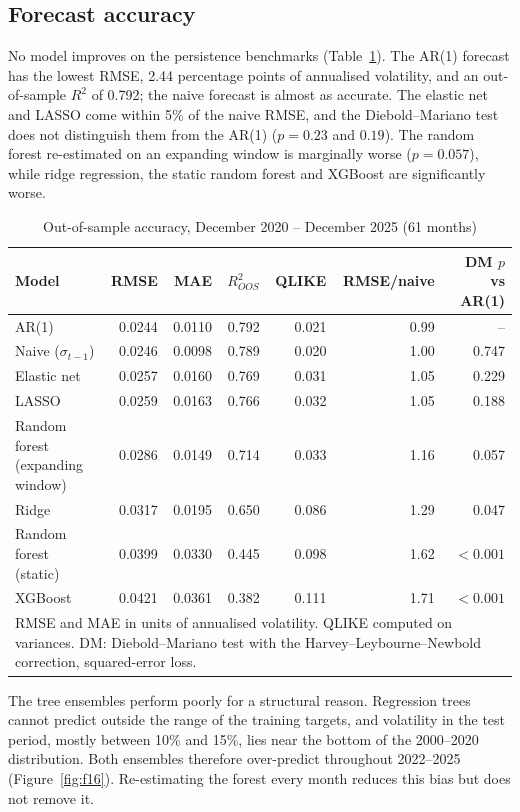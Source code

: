 \documentclass[10pt,twocolumn,a4paper]{article}
\begin{document}
\subsection{Forecast accuracy}

No model improves on the persistence benchmarks (Table~\ref{tab:ml}). The AR(1) forecast has the lowest RMSE, 2.44 percentage points of annualised volatility, and an out-of-sample $R^2$ of 0.792; the naive forecast is almost as accurate. The elastic net and LASSO come within 5\% of the naive RMSE, and the Diebold--Mariano test does not distinguish them from the AR(1) ($p=0.23$ and $0.19$). The random forest re-estimated on an expanding window is marginally worse ($p=0.057$), while ridge regression, the static random forest and XGBoost are significantly worse.

\begin{table}[!t]\centering\small
\caption{Out-of-sample accuracy, December 2020 -- December 2025 (61 months)}\label{tab:ml}
\setlength{\tabcolsep}{4pt}
\begin{tabular}{lrrrrrr}
\toprule
Model & RMSE & MAE & $R^2_{OOS}$ & QLIKE & RMSE/naive & DM $p$ vs AR(1) \\
\midrule
AR(1) & 0.0244 & 0.0110 & 0.792 & 0.021 & 0.99 & -- \\
Naive ($\sigma_{t-1}$) & 0.0246 & 0.0098 & 0.789 & 0.020 & 1.00 & 0.747 \\
Elastic net & 0.0257 & 0.0160 & 0.769 & 0.031 & 1.05 & 0.229 \\
LASSO & 0.0259 & 0.0163 & 0.766 & 0.032 & 1.05 & 0.188 \\
Random forest (expanding window) & 0.0286 & 0.0149 & 0.714 & 0.033 & 1.16 & 0.057 \\
Ridge & 0.0317 & 0.0195 & 0.650 & 0.086 & 1.29 & 0.047 \\
Random forest (static) & 0.0399 & 0.0330 & 0.445 & 0.098 & 1.62 & $<0.001$ \\
XGBoost & 0.0421 & 0.0361 & 0.382 & 0.111 & 1.71 & $<0.001$ \\
\bottomrule
\multicolumn{7}{p{0.95\textwidth}}{\footnotesize RMSE and MAE in units of annualised volatility. QLIKE computed on variances. DM: Diebold--Mariano test with the Harvey--Leybourne--Newbold correction, squared-error loss.}
\end{tabular}
\end{table}

The tree ensembles perform poorly for a structural reason. Regression trees cannot predict outside the range of the training targets, and volatility in the test period, mostly between 10\% and 15\%, lies near the bottom of the 2000--2020 distribution. Both ensembles therefore over-predict throughout 2022--2025 (Figure~\ref{fig:f16}). Re-estimating the forest every month reduces this bias but does not remove it.
\end{document}
